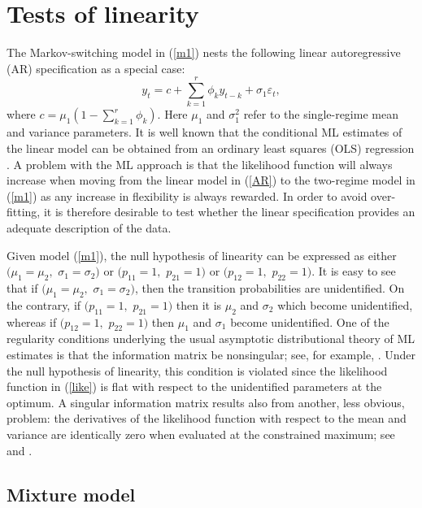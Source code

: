 \documentclass[11pt]{article}
\begin{document}
\section{Tests of linearity}

The Markov-switching model in (\ref{m1}) nests the following linear
autoregressive (AR) specification as a special case: 
\begin{equation}
y_{t} = c + \sum_{k=1}^{r}\phi _{k} y_{t-k} +\sigma_1 \varepsilon _{t},
\label{AR}
\end{equation}
where $c=\mu_1(1-\sum_{k=1}^r \phi_k)$. Here $\mu_1$ and $\sigma_1^2$ refer
to the single-regime mean and variance parameters. It is well known that the
conditional ML estimates of the linear model can be obtained from an
ordinary least squares (OLS) regression \citep[][Ch. 5]{Hamilton:1994}. A
problem with the ML approach is that the likelihood function will always
increase when moving from the linear model in (\ref{AR}) to the two-regime
model in (\ref{m1}) as any increase in flexibility is always rewarded. In
order to avoid over-fitting, it is therefore desirable to test whether the
linear specification provides an adequate description of the data.

Given model (\ref{m1}), the null hypothesis of linearity can be expressed as
either $(\mu _{1}=\mu _{2},$ $\sigma _{1}=\sigma _{2})$ or $(p_{11}=1,$ $%
p_{21}=1)$ or $(p_{12}=1,$ $p_{22}=1).$ It is easy to see that if $%
(\mu_{1}=\mu _{2},$ $\sigma _{1}=\sigma _{2})$, then the transition
probabilities are unidentified. On the contrary, if $(p_{11}=1,$ $p_{21}=1)$
then it is $\mu _{2}$ and $\sigma _{2}$ which become unidentified, whereas
if $(p_{12}=1,$ $p_{22}=1)$ then $\mu _{1}$ and $\sigma _{1}$ become
unidentified. One of the regularity conditions underlying the usual
asymptotic distributional theory of ML estimates is that the information
matrix be nonsingular; see, for example, \citet[][Ch.
7]{Gourieroux-Monfort:1995}. Under the null hypothesis of linearity, this
condition is violated since the likelihood function in (\ref{like}) is flat
with respect to the unidentified parameters at the optimum. A singular
information matrix results also from another, less obvious, problem: the
derivatives of the likelihood function with respect to the mean and variance
are identically zero when evaluated at the constrained maximum; see %
\citet{Hansen:1992} and \citet{Garcia:1998}.

\subsection{Mixture model}
\end{document}
